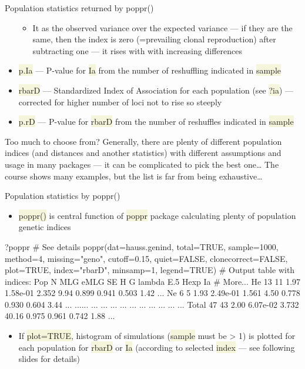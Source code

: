\documentclass[compress, xelatex, 11pt, xcolor=svgnames, aspectratio=169,
	hyperref={
		bookmarks=true,
		unicode=true,
		colorlinks=true,
		pdftitle={Molecular data in R},
		plainpages=false,
		pdfauthor={Vojtech Zeisek},
		pdfsubject={Course about phylogeny and evolution in R},
		pdfcreator={XeLaTeX},
		pdfkeywords={R, evolution, phylogeny, molecular data},
		linkcolor=Crimson, %
		anchorcolor=Magenta, %
		citecolor=Magenta, %
		filecolor=Magenta, %
		menucolor=Magenta, %
		urlcolor=DodgerBlue, %
		},
	url={hyphens, lowtilde} %
	]{beamer}
\renewcommand{\texttt}[1]{\colorbox{Beige}{{\ttfamily #1}}}
\begin{document}
\begin{frame}[allowframebreaks]{Population statistics returned by poppr()}
\begin{itemize}
\begin{itemize}
			\item It as the observed variance over the expected variance --- if they are the same, then the index is zero (=prevailing clonal reproduction) after subtracting one --- it rises with with increasing differences
		\end{itemize}
		\item \texttt{p.Ia} --- P-value for \texttt{Ia} from the number of reshuffling indicated in \texttt{sample}
		\item \texttt{rbarD} --- Standardized Index of Association for each population (see \texttt{?ia}) --- corrected for higher number of loci not to rise so steeply
		\item \texttt{p.rD} --- P-value for \texttt{rbarD} from the number of reshuffles indicated in \texttt{sample}
	\end{itemize}
	\begin{block}{Too much to choose from?}
		Generally, there are plenty of different population indices (and distances and another statistics) with different assumptions and usage in many packages --- it can be complicated to pick the best one\ldots{ }The course shows many examples, but the list is far from being exhaustive\ldots
	\end{block}
\end{frame}

\begin{frame}[fragile]{Population statistics by poppr()}
	\vfill
	\begin{itemize}
		\item \texttt{poppr()} is central function of \texttt{poppr} package calculating plenty of population genetic indices
	\end{itemize}
	\vfill
	\begin{spluscode}
    ?poppr # See details
    poppr(dat=hauss.genind, total=TRUE, sample=1000, method=4,
      missing="geno", cutoff=0.15, quiet=FALSE, clonecorrect=FALSE,
      plot=TRUE, index="rbarD", minsamp=1, legend=TRUE)
    # Output table with indices:
      Pop  N MLG eMLG       SE     H     G lambda   E.5  Hexp   Ia # More...
       He 13  11 1.97 1.58e-01 2.352  9.94  0.899 0.941 0.503 1.42 ...
       Ne  6   5 1.93 2.49e-01 1.561  4.50  0.778 0.930 0.604 3.44 ...
      ...... ...  ...      ...   ...   ...    ...   ...   ...  ... ...
    Total 47  43 2.00 6.07e-02 3.732 40.16  0.975 0.961 0.742 1.88 ...
	\end{spluscode}
	\vfill
	\begin{itemize}
		\item If \texttt{plot=TRUE}, histogram of simulations (\texttt{sample} must be > 1) is plotted for each population for \texttt{rbarD} or \texttt{Ia} (according to selected \texttt{index} --- see following slides for details)
	\end{itemize}
	\vfill
\end{frame}
\end{document}
